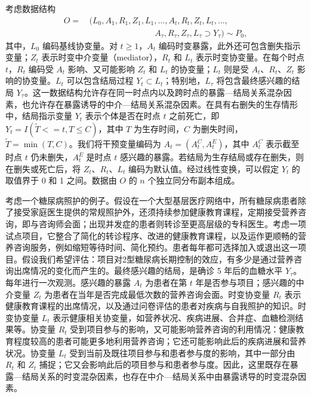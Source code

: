 考虑数据结构
\[
\begin{aligned}
 O=&\,(L_0,A_1,R_1,Z_1,L_1,\ldots,A_t,R_t,Z_t,L_t,\ldots,\\
 &\hspace{8em}A_\tau,R_\tau,Z_\tau,L_\tau\supset Y_\tau)\sim P_0,
\end{aligned}
\]
其中，$L_0$ 编码基线协变量。对 $t\geq1$，$A_t$ 编码时变暴露，此外还可包含删失指示变量；$Z_t$ 表示时变中介变量（mediator），$R_t$ 和 $L_t$ 表示时变协变量。在每个时点 $t$，$R_t$ 编码受 $A_t$ 影响、又可能影响 $Z_t$ 和 $L_t$ 的协变量；$L_t$ 则是受 $A_t$、$R_t$、$Z_t$ 影响的协变量。$L_t$ 可以包含结局过程 $Y_t\subset L_t$；特别地，$L_\tau$ 将包含最终感兴趣的结局 $Y_\tau$。这一数据结构允许存在同一时点内以及跨时点的暴露—结局关系混杂因素，也允许存在暴露诱导的中介—结局关系混杂因素。在具有右删失的生存情形中，结局指示变量 $Y_t$ 表示个体是否在时点 $t$ 之前死亡，即 $Y_t=I(\tilde T\mathrel{<=}t,T\leq C)$，其中 $T$ 为生存时间，$C$ 为删失时间，$\tilde T=\min(T,C)$。我们将干预变量编码为 $A_t=(A_t^C,A_t^E)$，其中 $A_t^C$ 表示截至时点 $t$ 仍未删失，$A_t^E$ 是时点 $t$ 感兴趣的暴露。若结局为生存结局或存在删失，则在删失或死亡后，将 $Z_t$、$R_t$、$L_t$ 编码为默认值。经过线性变换，可以假定 $Y_t$ 的取值界于 0 和 1 之间。数据由 $O$ 的 $n$ 个独立同分布副本组成。

考虑一个糖尿病照护的例子。假设在一个大型基层医疗网络中，所有糖尿病患者除了接受家庭医生提供的常规照护外，还须持续参加健康教育课程，定期接受营养咨询，即与咨询师会面；出现并发症的患者则转诊至更高层级的专科医生。考虑一项试点项目，它整合了简化的转诊程序、改进的健康教育课程，以及运作更顺畅的营养咨询服务，例如缩短等待时间、简化预约。患者每年都可选择加入或退出这一项目。假设我们希望评估：项目对2型糖尿病长期控制的效应，有多少是通过营养咨询出席情况的变化而产生的。最终感兴趣的结局，是确诊 5 年后的血糖水平 $Y_\tau$。每年进行一次观测。感兴趣的暴露 $A_t$ 为患者在第 $t$ 年是否参与项目；感兴趣的中介变量 $Z_t$ 为患者在当年是否完成最低次数的营养咨询会面。时变协变量 $R_t$ 表示健康教育课程的出席情况，以及通过问卷评估的患者对疾病与自我照护的知识。时变协变量 $L_t$ 表示健康相关协变量，如营养状况、疾病进展、合并症、血糖检测结果等。协变量 $R_t$ 受到项目参与的影响，又可能影响营养咨询的利用情况：健康教育程度较高的患者可能更多地利用营养咨询；它还可能影响此后的疾病进展和营养状况。协变量 $L_t$ 受到当前及既往项目参与和患者参与度的影响，其中一部分由 $R_t$ 和 $Z_t$ 捕捉；它又会影响此后的项目参与和患者参与度。因此，这里既存在暴露—结局关系的时变混杂因素，也存在中介—结局关系中由暴露诱导的时变混杂因素。


